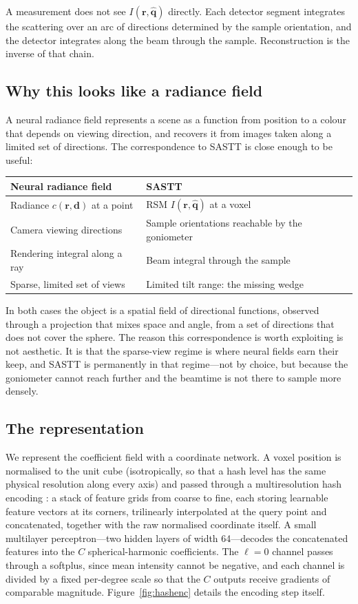 \documentclass[11pt,a4paper]{article}
\newcommand{\qvec}{\hat{\boldsymbol{q}}}
\newcommand{\rvec}{\boldsymbol{r}}
\begin{document}
A measurement does not see $I(\rvec,\qvec)$ directly. Each detector segment integrates
the scattering over an arc of directions determined by the sample orientation, and the
detector integrates along the beam through the sample. Reconstruction is the inverse of
that chain.

\subsection{Why this looks like a radiance field}

A neural radiance field represents a scene as a function from position to a colour that
depends on viewing direction, and recovers it from images taken along a limited set of
directions. The correspondence to SASTT is close enough to be useful:

\begin{center}
\begin{tabular}{@{}ll@{}}
\toprule
Neural radiance field & SASTT \\
\midrule
Radiance $c(\rvec, \boldsymbol{d})$ at a point & RSM $I(\rvec, \qvec)$ at a voxel \\
Camera viewing directions & Sample orientations reachable by the goniometer \\
Rendering integral along a ray & Beam integral through the sample \\
Sparse, limited set of views & Limited tilt range: the missing wedge \\
\bottomrule
\end{tabular}
\end{center}

In both cases the object is a spatial field of directional functions, observed through a
projection that mixes space and angle, from a set of directions that does not cover the
sphere. The reason this correspondence is worth exploiting is not aesthetic. It is that
the sparse-view regime is where neural fields earn their keep, and SASTT is permanently in
that regime---not by choice, but because the goniometer cannot reach further and the
beamtime is not there to sample more densely.

\subsection{The representation}

We represent the coefficient field with a coordinate network. A voxel position is
normalised to the unit cube (isotropically, so that a hash level has the same physical
resolution along every axis) and passed through a multiresolution hash encoding
\citep{Mueller2022}: a stack of feature grids from coarse to fine, each storing learnable
feature vectors at its corners, trilinearly interpolated at the query point and
concatenated, together with the raw normalised coordinate itself. A small multilayer
perceptron---two hidden layers of width 64---decodes the concatenated features into the $C$
spherical-harmonic coefficients. The $\ell=0$ channel
passes through a softplus, since mean intensity cannot be negative, and each channel is
divided by a fixed per-degree scale so that the $C$ outputs receive gradients of
comparable magnitude. Figure~\ref{fig:hashenc} details the encoding step itself.
\end{document}
